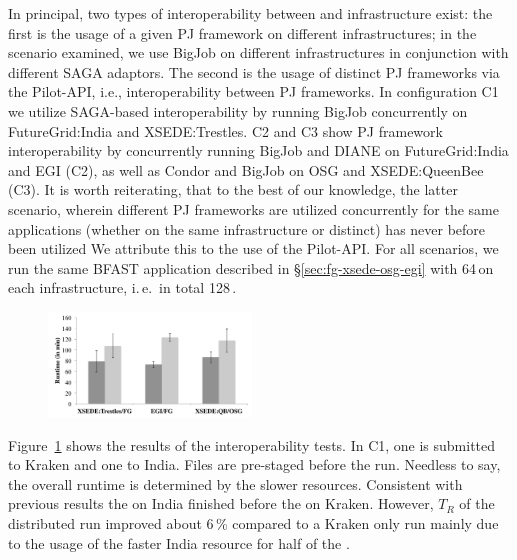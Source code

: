 \documentclass[conference]{IEEEtran}
\begin{document}
In principal, two types of interoperability between \pilotjobs and
infrastructure exist: the first is the usage of a given PJ framework
on different infrastructures; in the scenario examined, we use BigJob
on different infrastructures in conjunction with different SAGA
adaptors.  The second is the usage of distinct PJ frameworks via the
Pilot-API, i.e., interoperability between PJ frameworks. In
configuration C1 we utilize SAGA-based interoperability by running
BigJob concurrently on FutureGrid:India and XSEDE:Trestles. C2 and C3
show PJ framework interoperability by concurrently running BigJob and
DIANE on FutureGrid:India and EGI (C2), as well as Condor and BigJob
on OSG and XSEDE:QueenBee (C3). It is worth reiterating, that to the
best of our knowledge, the latter scenario, wherein different PJ
frameworks are utilized concurrently for the same applications
(whether on the same infrastructure or distinct) has never before been
utilized We attribute this to the use of the Pilot-API.  For all
scenarios, we run the same BFAST application described in
\S\ref{sec:fg-xsede-osg-egi} with 64\,\cus on each infrastructure,
i.\,e.\ in total 128\,\cus.

\begin{figure}[htbp]
  	\centering
	\includegraphics[width=0.48\textwidth]{../perf/interop/128-bfast-interop-with-staging.pdf}
	\caption{}
	\label{fig:perf_interop_128-bfast-interop}
\end{figure}


Figure~\ref{fig:perf_interop_128-bfast-interop} shows the results of
the interoperability tests. In C1, one \pilot is submitted to Kraken
and one to India.  Files are pre-staged before the
run. Needless to say, the overall runtime is determined by the slower
resources. Consistent with previous results the \pilot on India
finished before the \pilot on Kraken. However, $T_R$ of the
distributed run improved about 6\,\% compared to a Kraken only run
mainly due to the usage of the faster India resource for half of the
\cus.
\end{document}
